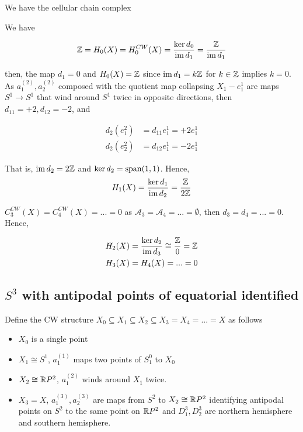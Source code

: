 \documentclass{article}
\begin{document}
We have the cellular chain complex

\begin{center}
\end{center}

We have

$$
    \mathbb{Z} = H_0(X) = H^{CW}_0(X) = \frac{\ker d_0}{\operatorname{im} d_1} = \frac{\mathbb{Z}}{\operatorname{im} d_1}
$$

then, the map $d_1 = 0$ and $H_0(X) = \mathbb{Z}$ since $\operatorname{im} d_1 = k\mathbb{Z}$ for $k \in \mathbb{Z}$ implies $k=0$. As $a^{(2)}_1, a^{(2)}_2$ composed with the quotient map collapsing $X_1 - e^1_1$ are maps $S^1 \to S^1$ that wind around $S^1$ twice in opposite directions, then $d_{1 1} = +2, d_{1 2} = -2$, and

\begin{align*}
    d_2(e^2_1) &= d_{1 1} e^1_1 = + 2 e^1_1\\
    d_2(e^2_2) &= d_{1 2} e^1_1 = - 2 e^1_1
\end{align*}

That is, $\operatorname{im} d_2 = 2 \mathbb{Z}$ and $\ker d_2 = \operatorname{span} (1, 1)$. Hence, 
$$
    H_1(X) = \frac{\ker d_1}{\operatorname{im} d_2} = \frac{\mathbb{Z}}{2\mathbb{Z}}
$$

$C^{CW}_3(X) = C^{CW}_4(X) = ... = 0$  as $\mathcal{A}_3 = \mathcal{A}_4 = ... = \emptyset$, then $d_3 = d_4 = ... = 0$. Hence,

\begin{align*}
    H_2(X) &= \frac{\ker d_2}{\operatorname{im} d_3} \cong \frac{\mathbb{Z}}{0} = \mathbb{Z} \\
    H_3(X) &= H_4(X) = ... = 0
\end{align*}

\subsection{$S^3$ with antipodal points of equatorial identified}

Define the CW structure $X_0 \subseteq X_1 \subseteq X_2 \subseteq X_3 = X_4 = ... = X$ as follows

\begin{itemize}
    \item $X_0$ is a single point
    \item $X_1 \cong S^1$, $a^{(1)}_1$ maps two points of $S^0_1$ to $X_0$
    \item $X_2 \cong \mathbb{R} P^2$, $a^{(2)}_1$ winds around $X_1$ twice.
    \item $X_3 = X$, $a^{(3)}_1, a^{(3)}_2$ are maps from $S^2$ to $X_2 \cong \mathbb{R} P^2$ identifying antipodal points on $S^2$ to the same point on $\mathbb{R} P^2$ and $D^3_1, D^3_2$ are northern hemisphere and southern hemisphere.
\end{itemize}
\end{document}
